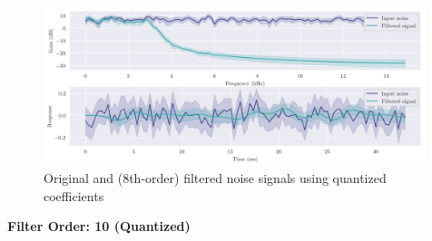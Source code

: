 \begin{figure}[!ht]
    \centering
    \includegraphics[width=0.99\textwidth]{images/q8_q8th_stability.png}
    \caption{Original and (8th-order) filtered noise signals using quantized coefficients}
\end{figure}

\newpage
{\Large\textbf{Filter Order: 10 (Quantized)}}
\vspace{1em}

